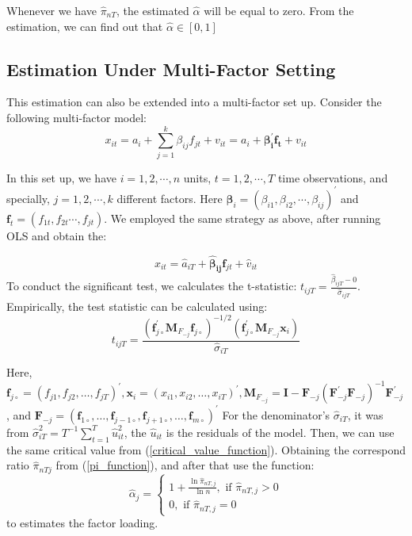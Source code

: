 Whenever we have $\hat{\pi}_{nT}$, the estimated $\hat{\alpha}$ will be equal to zero. 
From the estimation, we can find out that $\hat{\alpha} \in [0,1]$

	\subsection{Estimation Under Multi-Factor Setting}\label{strength_multi_estimation}

This estimation can also be extended into a multi-factor set up.
Consider the following multi-factor model:
\[x_{it} = a_i +\sum_{j = 1}^k\beta_{ij}f_{jt} +v_{it} = a_i + \mathbf{\beta^{\prime}_{i}f_{t}} +v_{it} \]

In this set up, we have $i = 1, 2, \cdots, n$ units, $t = 1, 2, \cdots, T$ time observations, and specially, $j = 1, 2,\cdots, k$ different factors.
Here $\mathbf{\beta}_{i} = (\beta_{i1}, \beta_{i2}, \cdots, \beta_{ij})^{\prime} $ and $\mathbf{f}_t = (f_{1t}, f_{2t}\cdots, f_{jt})$.
We employed the same strategy as above, after running OLS and obtain the:

\[ x_{it} =\hat{a}_{iT} + \mathbf{\hat{\beta}_{ij}}\mathbf{f}_{jt} + \hat{v}_{it}    \]
To conduct the significant test, we calculates the t-statistic: $t_{ijT} = \frac{\hat{\beta}_{ijT}-0}{\hat{\sigma}_{ijT}}$. Empirically, the test statistic can be calculated using:
\[ t_{i j T}=\frac{\left(\mathbf{f}_{j \circ}^{\prime} \mathbf{M}_{F_{-j}} \mathbf{f}_{j \circ}\right)^{-1 / 2}\left(\mathbf{f}_{j \circ}^{\prime} \mathbf{M}_{F_{-j}} \mathbf{x}_{i}\right)}{\hat{\sigma}_{i T}} \]

Here, $\mathbf{f}_{j \circ}=\left(f_{j 1}, f_{j 2}, \ldots, f_{j T}\right)^{\prime}, \mathbf{x}_{i}=\left(x_{i 1}, x_{i 2}, \ldots, x_{i T}\right)^{\prime}, \mathbf{M}_{F_{-j}}=\mathbf{I}-\mathbf{F}_{-j}\left(\mathbf{F}_{-j}^{\prime} \mathbf{F}_{-j}\right)^{-1} \mathbf{F}_{-j}^{\prime}$, and $\mathbf{F}_{-j}=\left(\mathbf{f}_{1 \circ}, \ldots, \mathbf{f}_{j-1 \circ}, \mathbf{f}_{j+1 \circ}, \ldots, \mathbf{f}_{m \circ}\right)^{\prime}$
For the denominator's $\hat{\sigma}_{iT}$, it was from $\hat{\sigma}_{i T}^{2}=T^{-1} \sum_{t=1}^{T} \hat{u}_{i t}^{2}$, the $\hat{u}_{it}$ is the residuals of the model.
Then, we can use the same critical value from (\ref{critical_value_function}).
Obtaining the correspond ratio $\hat{\pi}_{nTj}$  from (\ref{pi_function}), and after that use the function:
\begin{equation*}
\hat{\alpha}_{j}=\left\{\begin{array}{l}
1+\frac{\ln \hat{\pi}_{n T, j}}{\ln n}, \text { if } \hat{\pi}_{n T, j}>0 \\
0, \text { if } \hat{\pi}_{n T, j}=0
\end{array}\right.
\end{equation*}
to estimates the factor loading.

